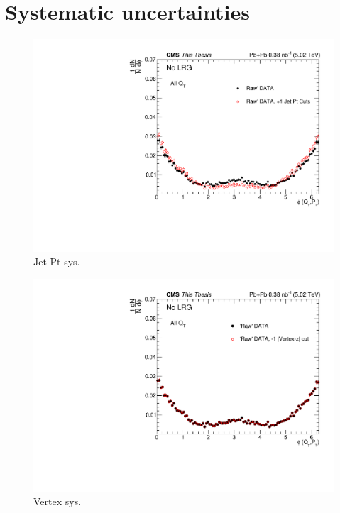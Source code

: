 
\chapter{Systematic uncertainties}

\begin{figure}[h!]
\begin{centering}
\includegraphics[width=5in]{Chapter7/importfigs/pt_sys_thesis.pdf}
\par\end{centering}
\caption{Jet Pt sys. \label{fig:ptSys}}
\end{figure}

\begin{figure}[h!]
\begin{centering}
\includegraphics[width=5in]{Chapter7/importfigs/vert_sys_thesis.pdf}
\par\end{centering}
\caption{Vertex sys. \label{fig:vertSys}}
\end{figure}

